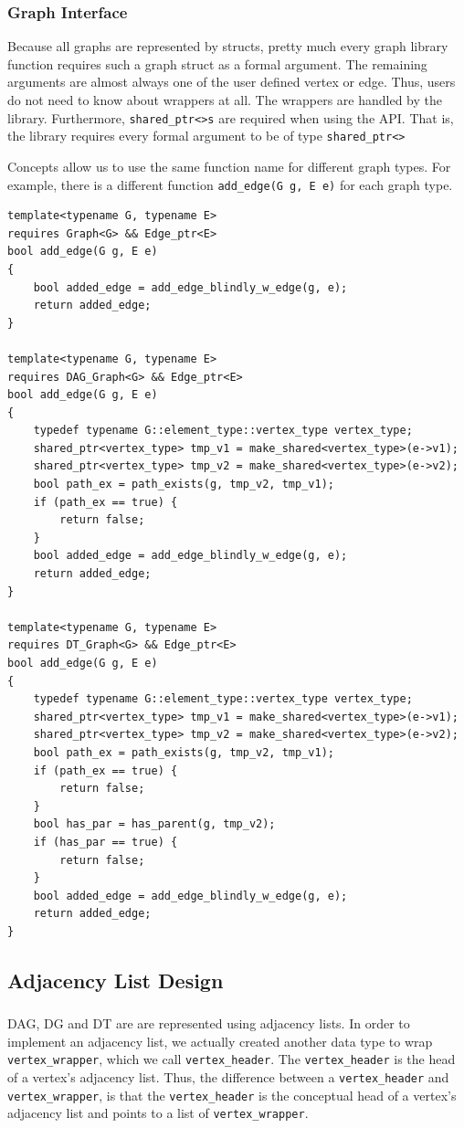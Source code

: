 \documentclass{article}
\begin{document}
\subsubsection{Graph Interface}
Because all graphs are represented by structs, pretty much every graph library function requires such a graph struct as a formal argument. The remaining arguments are almost always one of the user defined vertex or edge. Thus, users do not need to know about wrappers at all. The wrappers are handled by the library. Furthermore, \texttt{shared\_ptr<>s} are required when using the API. That is, the library requires every formal argument to be of type \texttt{shared\_ptr<>} 
\par
Concepts allow us to use the same function name for different graph types. For example, there is a different function \texttt{add\_edge(G g, E e)} for each graph type.
\begin{lstlisting}
template<typename G, typename E>
requires Graph<G> && Edge_ptr<E>
bool add_edge(G g, E e)
{
	bool added_edge = add_edge_blindly_w_edge(g, e);
	return added_edge;
}

template<typename G, typename E>
requires DAG_Graph<G> && Edge_ptr<E>
bool add_edge(G g, E e)
{
	typedef typename G::element_type::vertex_type vertex_type;
	shared_ptr<vertex_type> tmp_v1 = make_shared<vertex_type>(e->v1);
	shared_ptr<vertex_type> tmp_v2 = make_shared<vertex_type>(e->v2);
	bool path_ex = path_exists(g, tmp_v2, tmp_v1);
	if (path_ex == true) {
		return false;
	} 
	bool added_edge = add_edge_blindly_w_edge(g, e);
	return added_edge;
}

template<typename G, typename E>
requires DT_Graph<G> && Edge_ptr<E>
bool add_edge(G g, E e)
{
	typedef typename G::element_type::vertex_type vertex_type;
	shared_ptr<vertex_type> tmp_v1 = make_shared<vertex_type>(e->v1);
	shared_ptr<vertex_type> tmp_v2 = make_shared<vertex_type>(e->v2);
	bool path_ex = path_exists(g, tmp_v2, tmp_v1);
	if (path_ex == true) {
		return false;
	}
	bool has_par = has_parent(g, tmp_v2);
	if (has_par == true) {
		return false;
	}
	bool added_edge = add_edge_blindly_w_edge(g, e);
	return added_edge;
}
\end{lstlisting}

\subsection{Adjacency List Design}
\subsubsection{}
DAG, DG and DT are are represented using adjacency lists. In order to implement an adjacency list, we actually created another data type to wrap \texttt{vertex\_wrapper}, which we call \texttt{vertex\_header}. The \texttt{vertex\_header} is the head of a vertex's adjacency list. Thus, the difference between a \texttt{vertex\_header} and \texttt{vertex\_wrapper}, is that the \texttt{vertex\_header} is the conceptual head of a vertex's adjacency list and points to a list of \texttt{vertex\_wrapper}.
\end{document}
